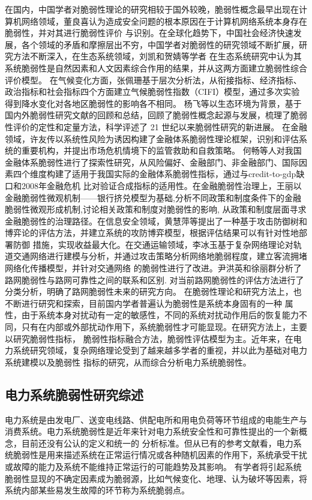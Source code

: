 在国内，中国学者对脆弱性理论的研究相较于国外较晚，脆弱性概念最早出现在计算机网络领域，董良喜认为造成安全问题的根本原因在于计算机网络系统本身存在脆弱性，并对其进行脆弱性评价
与识别\cite{refs17}。在全球化趋势下，中国社会经济快速发展，各个领域的矛盾和摩擦层出不穷，中国学者对脆弱性的研究领域不断扩展，研究方法不断深入，在生态系统领域，刘凯和贺婧等学者
在生态系统研究中认为其系统脆弱性是自然因素和人文因素综合作用的结果，并从这两方面建立脆弱性综合评价模型\cite{refs18,refs19}。
在气候变化方面，张佩珊基于层次分析法，从衔接指标、经济指标、政治指标和社会指标四个方面建立气候脆弱性指数（CIFI）模型，通过多次实验得到降水变化对各地区脆弱性的影响各不相同\cite{refs20}。
杨飞等以生态环境为背景，基于国内外脆弱性研究文献的回顾和总结，回顾了脆弱性概念起源与发展，梳理了脆弱性评价的定性和定量方法，科学评述了 21 世纪以来脆弱性研究的新进展\cite{refs21}。
在金融领域，许友传以系统性风险为诱因构建了金融体系脆弱性理论框架，识别和评估系统的重要机构，并提出市场危机情境下的监管救助和自救策略\cite{refs22}。
何畅等人对我国金融体系脆弱性进行了探索性研究，从风险偏好、金融部门、非金融部门、国际因素四个维度构建了适用于我国实际的金融体系脆弱性指标，通过与credit-to-gdp缺口和2008年金融危机
比对验证合成指标的适用性\cite{refs23}。在金融脆弱性治理上，王丽以金融脆弱性微观机制——银行挤兑模型为基础,分析不同政策和制度条件下的金融脆弱性微观形成机制,讨论相关政策和制度对脆弱性的影响,
从政策和制度层面寻求金融脆弱性的治理路径\cite{refs24}。在信息安全领域，黄慧萍等提出了一种基于攻击防御树和博弈论的评估方法，并建立系统的攻防博弈模型，根据评估结果可以有针对性地部署防御
措施，实现收益最大化\cite{refs25,refs26}。在交通运输领域，李冰玉基于复杂网络理论对轨道交通网络进行建模与分析，并通过攻击策略分析网络地脆弱程度，建立客流拥堵网络化传播模型，并针对交通网络
的脆弱性进行了改进\cite{refs27}。尹洪英和徐丽群分析了路网脆弱性与路网可靠性之间的联系和区别. 对当前路网脆弱性的评估方法进行了分类分析，明确了路网脆弱性未来的研究方向\cite{refs28}。
在脆弱性理论和研究方法上，也不断进行研究和探索，目前国内学者普遍认为脆弱性是系统本身固有的一种
属性，由于系统本身对扰动有一定的敏感性，不同的系统对扰动作用后的恢复能力不同，只有在内部或外部扰动作用下，系统脆弱性才可能显现。在研究方法上，主要以研究脆弱性指标\cite{refs29}，
脆弱性指标融合方法\cite{refs30}，脆弱性评估模型为主。近年来，在电力系统研究领域，复杂网络理论\cite{refs31}受到了越来越多学者的重视，并以此为基础对电力系统建模以及脆弱性
指标的研究，从而综合分析电力系统脆弱性。


\subsection{电力系统脆弱性研究综述}
\label{sec:presentPowerSys}
电力系统是由发电厂、送变电线路、供配电所和用电负荷等环节组成的电能生产与消费系统。电力系统脆弱性是近年来针对电力系统安全性和可靠性提出的一个新概念，目前还没有公认的定义和统一的
分析标准。但从已有的参考文献看，电力系统脆弱性是用来描述系统在正常运行情况或各种随机因素的作用下，系统承受干扰或故障的能力及系统不能维持正常运行的可能趋势及其影响\cite{refs32}。
有学者将引起系统脆弱性显现的不确定因素成为脆弱源，比如气候变化、地理、认为破坏等因素，将系统内部某些易发生故障的环节称为系统脆弱点。


